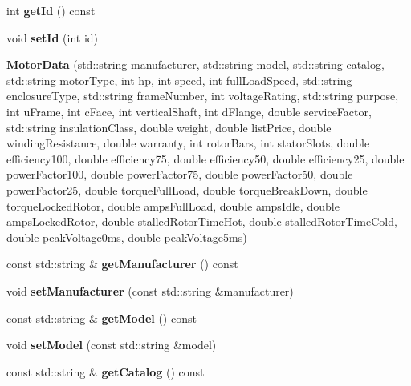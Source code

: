 \begin{DoxyCompactItemize}
int {\bfseries get\+Id} () const
\item 
\mbox{\label{class_motor_data_ae26351f2cfd4e0acbd413b008ac2759f}} 
void {\bfseries set\+Id} (int id)
\item 
\mbox{\label{class_motor_data_aebca34509f0587da9fe3d488aba3a94e}} 
{\bfseries Motor\+Data} (std\+::string manufacturer, std\+::string model, std\+::string catalog, std\+::string motor\+Type, int hp, int speed, int full\+Load\+Speed, std\+::string enclosure\+Type, std\+::string frame\+Number, int voltage\+Rating, std\+::string purpose, int u\+Frame, int c\+Face, int vertical\+Shaft, int d\+Flange, double service\+Factor, std\+::string insulation\+Class, double weight, double list\+Price, double winding\+Resistance, double warranty, int rotor\+Bars, int stator\+Slots, double efficiency100, double efficiency75, double efficiency50, double efficiency25, double power\+Factor100, double power\+Factor75, double power\+Factor50, double power\+Factor25, double torque\+Full\+Load, double torque\+Break\+Down, double torque\+Locked\+Rotor, double amps\+Full\+Load, double amps\+Idle, double amps\+Locked\+Rotor, double stalled\+Rotor\+Time\+Hot, double stalled\+Rotor\+Time\+Cold, double peak\+Voltage0ms, double peak\+Voltage5ms)
\item 
\mbox{\label{class_motor_data_a7740ec636c42ee3d6b2a8ce94864043a}} 
const std\+::string \& {\bfseries get\+Manufacturer} () const
\item 
\mbox{\label{class_motor_data_a3bd37613532ae8c3ca1f40d474af75a2}} 
void {\bfseries set\+Manufacturer} (const std\+::string \&manufacturer)
\item 
\mbox{\label{class_motor_data_a464e52cce186661b1491fd48956c2603}} 
const std\+::string \& {\bfseries get\+Model} () const
\item 
\mbox{\label{class_motor_data_a8d5385d24308d0627f7840ecfe2e6513}} 
void {\bfseries set\+Model} (const std\+::string \&model)
\item 
\mbox{\label{class_motor_data_a051ccda5450df2ccae18db8087fe04b3}} 
const std\+::string \& {\bfseries get\+Catalog} () const
\item 

\end{DoxyCompactItemize}
